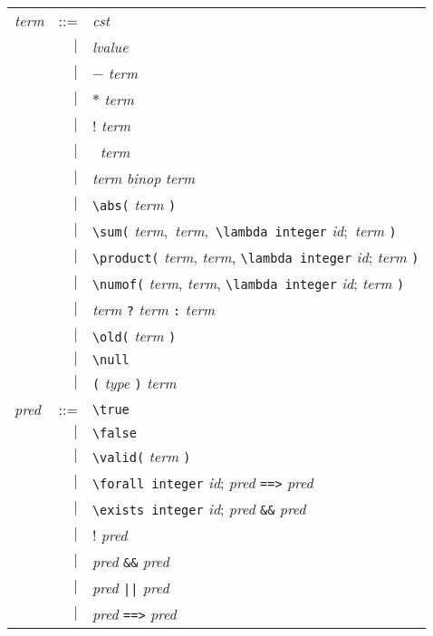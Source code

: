 \begin{tabular}{lrl}
  \textit{term} & ::= & \textit{cst} \\
  & $\mid$ & \textit{lvalue} \\
  & $\mid$ & $-$ \textit{term} \\
  & $\mid$ & $*$ \textit{term} \\
  & $\mid$ & $!$ \textit{term} \\
  & $\mid$ & $~$ \textit{term} \\
  & $\mid$ & \textit{term} \textit{binop} \textit{term} \\
  & $\mid$ & \lstinline'\abs(' \textit{term} \lstinline')' \\
  & $\mid$ & \lstinline'\sum(' \textit{term}$,$ \textit{term}$,$
  \lstinline'\lambda integer' \textit{id}$;$ \textit{term} \lstinline')' \\
  & $\mid$ & \lstinline'\product(' \textit{term}, \textit{term},
  \lstinline'\lambda integer' \textit{id}; \textit{term} \lstinline')' \\
  & $\mid$ & \lstinline'\numof(' \textit{term}, \textit{term},
  \lstinline'\lambda integer' \textit{id}; \textit{term} \lstinline')' \\
  & $\mid$ & \textit{term} \texttt{?} \textit{term} \texttt{:} \textit{term} \\
  & $\mid$ & \lstinline'\old(' \textit{term} \lstinline')' \\
  & $\mid$ & \lstinline'\null' \\
  & $\mid$ & \lstinline'(' \textit{type} \lstinline')' \textit{term} \\
  \textit{pred} & ::= & \lstinline'\true' \\
  & $\mid$ & \lstinline'\false' \\
  & $\mid$ & \lstinline'\valid(' \textit{term} \lstinline')' \\
  & $\mid$ & \lstinline'\forall integer' \textit{id};
  \textit{pred} \lstinline'==>' \textit{pred} \\
  & $\mid$ & \lstinline'\exists integer' \textit{id};
  \textit{pred} \lstinline'&&' \textit{pred} \\
  & $\mid$ & ! \textit{pred} \\
  & $\mid$ & \textit{pred} \lstinline'&&' \textit{pred} \\
  & $\mid$ & \textit{pred} \lstinline'||' \textit{pred} \\
  & $\mid$ & \textit{pred} \lstinline'==>' \textit{pred} \\

\end{tabular}
